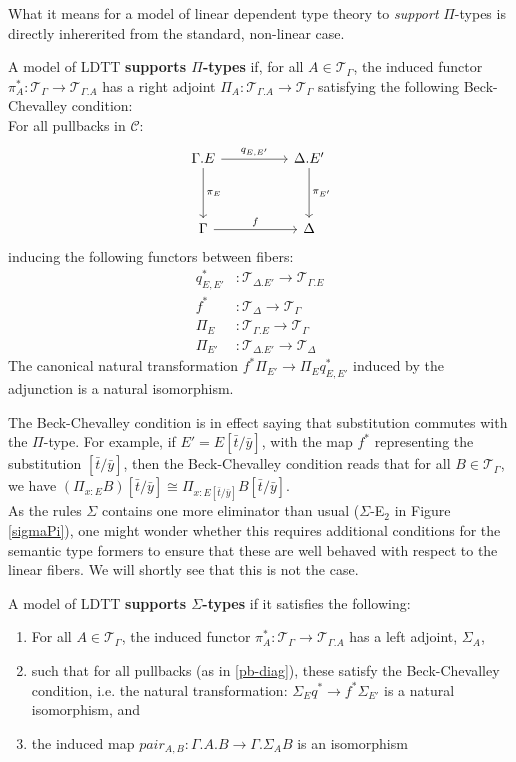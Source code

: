 What it means for a model of linear dependent type theory to \textit{support} $\Pi$-types is directly inhererited from the standard, non-linear case.
\begin{defn}A model of LDTT \textbf{supports $\Pi$-types} if, for all $A \in \mathcal{T}_{\Gamma}$, the induced functor $\pi_A^* : \mathcal{T}_{\Gamma} \to \mathcal{T}_{\Gamma.A}$ has a right adjoint $\Pi_A : \mathcal{T}_{\Gamma.A} \to \mathcal{T}_{\Gamma}$ satisfying the following Beck-Chevalley condition:\\
For all pullbacks in $\mathcal{C}$:
  \begin{equation}\label{pb-diag}
    \ti
    \Gamma.E \ar[d, "\pi_E"] \ar[r, "q_{E, E'}"] & \Delta.E' \ar[d, "\pi_{E'}"] \\
    \Gamma \ar[r, "f"] & \Delta
    \kz
  \end{equation}
inducing the following functors between fibers:
\[
  \begin{split}
    q^*_{E, E'} &: \mathcal{T}_{\Delta.E'} \to \mathcal{T}_{\Gamma.E}\\
    f^* &: \mathcal{T}_{\Delta} \to \mathcal{T}_{\Gamma}\\
    \Pi_E &: \mathcal{T}_{\Gamma.E} \to \mathcal{T}_{\Gamma}\\
    \Pi_{E'} &: \mathcal{T}_{\Delta.E'} \to \mathcal{T}_{\Delta}
  \end{split}    
\]
The canonical natural transformation $f^*\Pi_{E'} \to \Pi_{E}q^*_{E, E'}$ induced by the adjunction is a natural isomorphism.\\
\end{defn}
The Beck-Chevalley condition is in effect saying that substitution commutes with the $\Pi$-type. For example, if $E' = E[\bar t/\bar y]$, with the map $f^*$ representing the substitution $[\bar t/\bar y]$, then the Beck-Chevalley condition reads that for all $B \in \mathcal{T}_{\Gamma}$, we have $(\Pi_{x : E}B)[\bar t/\bar y] \cong \Pi_{x : E[\bar t/\bar y]}B[\bar t/\bar y]$.\\
As the rules $\Sigma$ contains one more eliminator than usual ($\Sigma$-E$_2$ in Figure \ref{sigmaPi}), one might wonder whether this requires additional conditions for the semantic type formers to ensure that these are well behaved with respect to the linear fibers. We will shortly see that this is not the case.
\begin{defn}A model of LDTT \textbf{supports $\Sigma$-types} if it satisfies the following:
  \begin{enumerate}
  \item For all $A \in \mathcal{T}_{\Gamma}$, the induced functor $\pi_A^* : \mathcal{T}_{\Gamma} \to \mathcal{T}_{\Gamma.A}$ has a left adjoint, $\Sigma_A$,
  \item such that for all pullbacks (as in \ref{pb-diag}), these satisfy the Beck-Chevalley condition, i.e. the natural transformation: $\Sigma_Eq^* \to f^*\Sigma_{E'}$ is a natural isomorphism, and
  \item the induced map $pair_{A,B} : \Gamma.A.B \to \Gamma.\Sigma_AB$ is an isomorphism
  \end{enumerate}
\end{defn}
